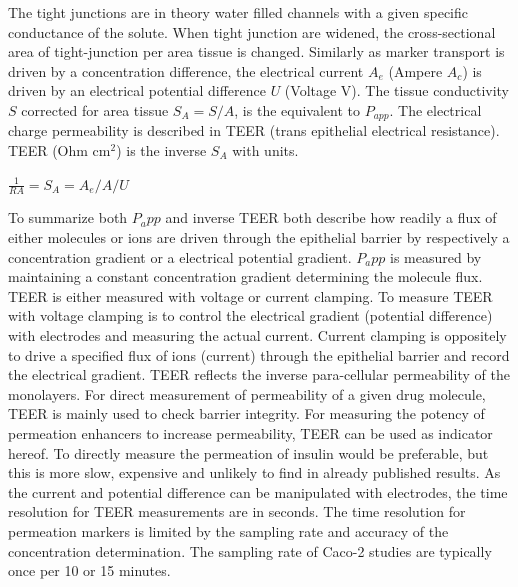 The tight junctions are in theory water filled channels with a given specific conductance of the solute. When tight junction are widened, the cross-sectional area of tight-junction per area tissue is changed. Similarly as marker transport is driven by a concentration difference, the electrical current $A_{e}$ (Ampere $A_c$) is driven by an electrical potential difference $U$ (Voltage V). The tissue conductivity $S$ corrected for area tissue $S_A = S/A$, is the equivalent to $P_{app}$. The electrical charge permeability is described in TEER (trans epithelial electrical resistance). TEER (Ohm cm$^2$) is the inverse $S_A$ with units.

$\frac{1}{RA} = S_A = A_e/A / U \quad$

To summarize both $P_app$ and inverse TEER both describe how readily a flux of either molecules or ions are driven through the epithelial barrier by respectively a concentration gradient or a electrical potential gradient. $P_app$ is measured by maintaining a constant concentration gradient determining the molecule flux. TEER is either measured with voltage or current clamping. To measure TEER with voltage clamping is to control the electrical gradient (potential difference) with electrodes and measuring the actual current. Current clamping is oppositely to drive a specified flux of ions (current) through the epithelial barrier and record the electrical gradient. TEER reflects the inverse para-cellular permeability of the monolayers. For direct measurement of permeability of a given drug molecule, TEER is mainly used to check barrier integrity. For measuring the potency of permeation enhancers to increase permeability, TEER can be used as indicator hereof. To directly measure the permeation of insulin would be preferable, but this is more slow, expensive and unlikely to find in already published results. As the current and potential difference can be manipulated with electrodes, the time resolution for TEER measurements are in seconds. The time resolution for permeation markers is limited by the sampling rate and accuracy of the concentration determination. The sampling rate of Caco-2 studies are typically once per 10 or 15 minutes.

